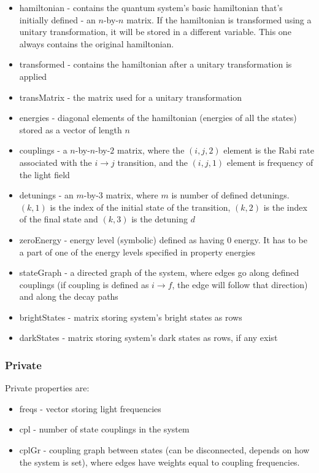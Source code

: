 \documentclass{article}
\numberwithin{equation}{section}
\numberwithin{figure}{section}
\numberwithin{table}{section}
\newcommand\codevar[1]{\ttfamily #1\rmfamily}
\begin{document}
\begin{itemize}
\item \codevar{hamiltonian} - contains the quantum system's basic hamiltonian that's initially defined - an $n$-by-$n$ matrix. If the hamiltonian is transformed using a unitary transformation, it will be stored in a different variable. This one always contains the original hamiltonian.
\item \codevar{transformed} - contains the hamiltonian after a unitary transformation is applied
\item \codevar{transMatrix} - the matrix used for a unitary transformation
\item \codevar{energies} - diagonal elements of the hamiltonian (energies of all the states) stored as a vector of length $n$
\item \codevar{couplings} - a $n$-by-$n$-by-$2$ matrix, where the $(i,j,2)$ element is the Rabi rate associated with the $i\rightarrow j$ transition, and the $(i,j,1)$ element is frequency of the light field
\item \codevar{detunings} - an $m$-by-3 matrix, where $m$ is number of defined detunings. $(k,1)$ is the index of the initial state of the transition, $(k,2)$ is the index of the final state and $(k,3)$ is the detuning $d$
\item \codevar{zeroEnergy} - energy level (symbolic) defined as having 0 energy. It has to be a part of one of the energy levels specified in property \codevar{energies}
\item \codevar{stateGraph} - a directed graph of the system, where edges go along defined couplings (if coupling is defined as $i\rightarrow f$, the edge will follow that direction) and along the decay paths
\item \codevar{brightStates} - matrix storing system's bright states as rows
\item \codevar{darkStates} - matrix storing system's dark states as rows, if any exist

\end{itemize}

\subsubsection*{Private}

Private properties are:

\begin{itemize}
\item \codevar{freqs} - vector storing light frequencies
\item \codevar{cpl} - number of state couplings in the system
\item \codevar{cplGr} - coupling graph between states (can be disconnected, depends on how the system is set), where edges have weights equal to coupling frequencies. 
\end{itemize}
\end{document}
